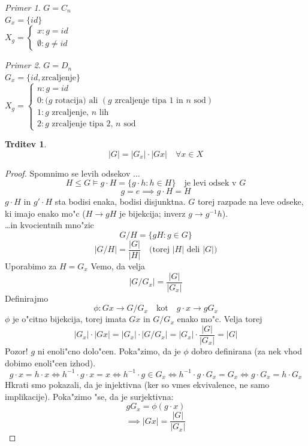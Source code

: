 \documentclass[a4paper,12pt]{article}
\theoremstyle{definition}
\newtheorem{claim}[counter]{Trditev}
\theoremstyle{remark}
\newtheorem*{ex}{Primer}
\begin{document}
\begin{ex}
	$G = C_n$\\
	$G_x = \lbrace id \rbrace$\\
	$X_g = \begin{cases}x: g = id\\\emptyset: g\neq id\end{cases}$
\end{ex}
\begin{ex}
	$G = D_n$\\
	$G_x = \lbrace id, \text{zrcaljenje} \rbrace$\\
	$X_g = \begin{cases}n: g = id\\ 0: (g \text{ rotacija) ali }(g\text{ zrcaljenje tipa 1 in }n\text{ sod}) \\ 1: g \text{ zrcaljenje, }n\text{ lih} \\ 2: g \text{ zrcaljenje tipa 2, }n\text{ sod}\end{cases}$
\end{ex}

\begin{claim}
	$$|G| = |G_x| \cdot |Gx| \quad \forall x \in X$$
\end{claim}
\begin{proof}
	Spomnimo se levih odsekov $\ldots$
	$$ H \leqslant G \models g \cdot H = \lbrace g \cdot h : h \in H \rbrace \quad \text{je levi odsek v }G $$
	$$g = e \implies g \cdot H = H$$
	$g \cdot H$ in $g' \cdot H$ sta bodisi enaka, bodisi disjunktna.
	$G$ torej razpade na leve odseke, ki imajo enako mo"c ($H \rightarrow gH$ je bijekcija; inverz $g \rightarrow g^{-1}h$).
	\\
	\ldots in kvocientnih mno"zic
	$$G/H = \lbrace gH: g \in G \rbrace$$
	$$|G/H| = \frac{|G|}{|H|} \quad \text{(torej } |H| \text{ deli } |G|\text{)} $$
	Uporabimo za $H=G_x$
	Vemo, da velja $$|G/G_x| = \frac{|G|}{|G_x|}$$
	Definirajmo $$\phi: Gx \rightarrow G/G_x \quad \text{kot} \quad g \cdot x \rightarrow gG_x$$
	$\phi$ je o"citno bijekcija, torej imata $Gx$ in $G/G_x$ enako mo"c.
	Velja torej
	$$|G_x|\cdot|Gx| = |G_x| \cdot |G/G_x| = |G_x| \cdot \frac{|G|}{|G_x|} = |G| $$
	Pozor! $g$ ni enoli"cno dolo"cen. Poka"zimo, da je $\phi$ dobro definirana (za nek vhod dobimo enoli"cen izhod).
	$$g \cdot x = h \cdot x \iff h^{-1} \cdot g \cdot x = x \iff h^{-1} \cdot g \in G_x \iff h^{-1} \cdot g \cdot G_x = G_x \iff g \cdot G_x = h \cdot G_x $$
	Hkrati smo pokazali, da je injektivna (ker so vmes ekvivalence, ne samo implikacije).
	Poka"zimo "se, da je surjektivna:
	$$gG_x = \phi (g \cdot x) $$
	$$\implies |Gx| = \frac{|G|}{|G_x|}$$
\end{proof}
\end{document}
